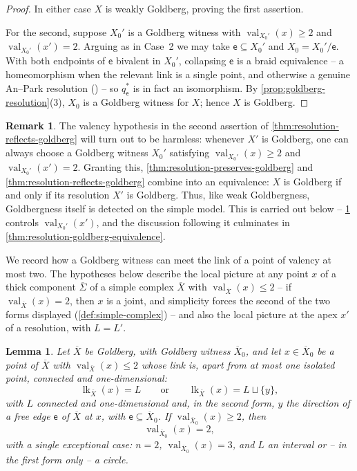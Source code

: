 \documentclass[reqno]{amsart}
\newtheorem{lemma}[theorem]{Lemma}
\theoremstyle{definition}
\newtheorem{remark}[theorem]{Remark}
\newcommand\sfe{\mathsf{e}}
\renewcommand{\bar}{\overline}
\DeclareMathOperator{\lk}{lk}
\DeclareMathOperator{\val}{val}
\numberwithin{equation}{section}
\begin{document}
\begin{proof}
In either case \(X\) is weakly Goldberg, proving the first assertion.

For the second, suppose \(X_0'\) is a Goldberg witness with
\(\val_{X_0'}(x)\ge 2\) and \(\val_{X_0'}(x')=2\). Arguing as in Case~2 we may take
\(\sfe\subseteq X_0'\) and \(X_0=X_0'/\sfe\). With both endpoints of \(\sfe\)
bivalent in \(X_0'\), collapsing \(\sfe\) is a braid equivalence -- a
homeomorphism when the relevant link is a single point, and otherwise
a genuine An--Park resolution (\cite[Prop.~3.11]{AnPark2017}) -- so
\(q_\sfe^\ast\) is in fact an isomorphism. By
\cref{prop:goldberg-resolution}(3), \(X_0\) is a Goldberg witness for
\(X\); hence \(X\) is Goldberg.
\end{proof}

\begin{remark}\label{rem:resolution-goldberg-equivalence}
The valency hypothesis in the second assertion of
\cref{thm:resolution-reflects-goldberg} will turn out to be
harmless: whenever \(X'\) is Goldberg, one can always choose a
Goldberg witness \(X_0'\) satisfying \(\val_{X_0'}(x)\geq2\) and
\(\val_{X_0'}(x')=2\). Granting this,
\cref{thm:resolution-preserves-goldberg} and
\cref{thm:resolution-reflects-goldberg} combine into an
equivalence: \(X\) is Goldberg if and only if its resolution
\(X'\) is Goldberg. Thus, like weak Goldbergness, Goldbergness
itself is detected on the simple model. This is carried out below
-- \cref{lem:witness-apex-valency} controls
\(\val_{X_0'}(x')\), and the discussion following it culminates in
\cref{thm:resolution-goldberg-equivalence}.
\end{remark}

We record how a Goldberg witness can meet the link of a point of
valency at most two. The hypotheses below describe the local
picture at any point \(x\) of a thick component \(\bar\Sigma\) of
a simple complex \(\bar X\) with \(\val_{\bar X}(x)\leq2\) -- if
\(\val_{\bar X}(x)=2\), then \(x\) is a joint, and simplicity
forces the second of the two forms displayed
(\cref{def:simple-complex}) -- and also the local picture at the
apex \(x'\) of a resolution, with \(L=L'\).

\begin{lemma}\label{lem:witness-apex-valency}
Let \(\bar X\) be Goldberg, with Goldberg witness \(\bar X_0\),
and let \(x\in\bar X_0\) be a point of \(\bar X\) with
\(\val_{\bar X}(x)\leq2\) whose link is, apart from at most one
isolated point, connected and one-dimensional:
\[
\lk_{\bar X}(x)=L
\qquad\text{or}\qquad
\lk_{\bar X}(x)=L\sqcup\{y\},
\]
with \(L\) connected and one-dimensional and, in the second
form, \(y\) the direction of a free edge \(\sfe\) of \(\bar X\) at
\(x\), with \(\sfe\subseteq\bar X_0\). If
\(\val_{\bar X_0}(x)\geq2\), then
\[
\val_{\bar X_0}(x)=2,
\]
with a single exceptional case: \(n=2\),
\(\val_{\bar X_0}(x)=3\), and \(L\) an interval or -- in the
first form only -- a circle.
\end{lemma}
\end{document}
